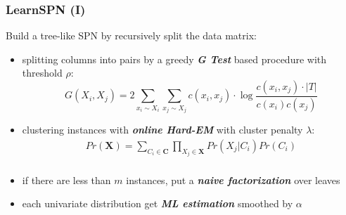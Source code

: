 \documentclass[xcolor={usenames,dvipsnames,svgnames}, compress]{beamer}
\begin{document}
\begin{frame}
  \frametitle{LearnSPN (I)}
  \footnotesize
  Build a tree-like SPN by recursively split the data matrix:

  \begin{itemize}
  \item splitting columns into pairs by a greedy \textbf{\emph{G Test}} based
    procedure with threshold $\rho$:
    \[
    G(X_i, X_j) =  2\sum_{x_i \sim X_i}\sum_{x_j \sim X_j}c(x_i, x_j)\cdot \log\frac{c(x_i, x_j)\cdot |T|}{c(x_i)c(x_j)}
    \]
  \item clustering instances with \textbf{\emph{online Hard-EM}} with cluster penalty
    $\lambda$:
    \[\begin{array}{cc}
        Pr(\mathbf{X})= \sum_{C_i \in \mathbf{C}}\prod_{X_j \in \mathbf{X}}Pr(X_j|C_i)Pr(C_i)\\
      \end{array}\]
  \item if there are less than $m$ instances, put a \textbf{\emph{naive
    factorization}} over leaves
  \item each univariate distribution get \emph{\textbf{ML estimation}} smoothed by $\alpha$  
  \end{itemize}
  

\end{frame}
\end{document}
